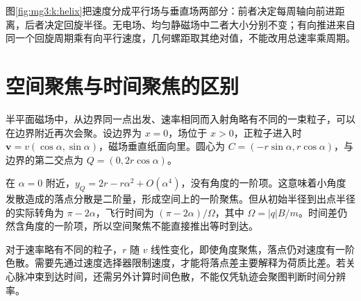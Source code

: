 
图\ref{fig:mg3:k:helix}把速度分成平行场与垂直场两部分：前者决定每周轴向前进距离，后者决定回旋半径。无电场、均匀静磁场中二者大小分别不变；有向推进来自同一个回旋周期乘有向平行速度，几何螺距取其绝对值，不能改用总速率乘周期。


\section{空间聚焦与时间聚焦的区别}
半平面磁场中，从边界同一点出发、速率相同而入射角略有不同的一束粒子，可以在边界附近再次会聚。设边界为 $x=0$，场位于 $x>0$，正粒子进入时 $\bm v=v(\cos\alpha,\sin\alpha)$，磁场垂直纸面向里。圆心为 $C=(-r\sin\alpha,r\cos\alpha)$，与边界的第二交点为 $Q=(0,2r\cos\alpha)$。


在 $\alpha=0$ 附近，$y_Q=2r-r\alpha^2+O(\alpha^4)$，没有角度的一阶项。这意味着小角度发散造成的落点分散是二阶量，形成空间上的一阶聚焦。但从初始半径到出点半径的实际转角为 $\pi-2\alpha$，飞行时间为 $(\pi-2\alpha)/\Omega$，其中 $\Omega=|q|B/m$。时间差仍然含角度的一阶项，所以空间聚焦不能直接推出等时到达。


对于速率略有不同的粒子，$r$ 随 $v$ 线性变化，即使角度聚焦，落点仍对速度有一阶色散。需要先通过速度选择器限制速度，才能将落点差主要解释为荷质比差。若关心脉冲束到达时间，还需另外计算时间色散，不能仅凭轨迹会聚图判断时间分辨率。

